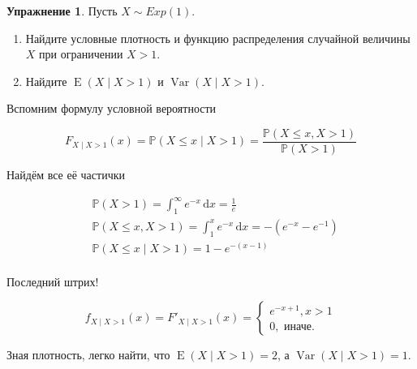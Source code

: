 \documentclass[12pt, a4paper, oneside]{extreport}
\DeclareMathOperator{\Var}{Var}
\DeclareMathOperator{\E}{\mathop{E}}
\def \mbb{\mathbb}
\def \PP{\mbb{P}}
\newcommand{\dx}[1]{\,\mathrm{d}#1} %
\theoremstyle{plain}              %
\theoremstyle{definition}         %
\newtheorem{problem}{\color{myblue} Упражнение}
\begin{document}
\begin{problem} 
Пусть $X \sim Exp(1)$. 

\begin{enumerate} 
\item  Найдите условные плотность и функцию распределения случайной величины $X$ при ограничении $X > 1$.
\item  Найдите $\E(X \mid X > 1)$ и  $\Var(X \mid X > 1)$.
\end{enumerate} 
\begin{sol}
	Вспомним формулу условной вероятности
	
	\[ F_{X \mid X > 1} (x) = \PP(X \le x \mid X > 1) = \frac{\PP(X \le x, X > 1)}{\PP(X > 1)}\]
	
Найдём все её частички

\begin{equation*}
\begin{aligned}
& \PP(X > 1) = \int_1^{\infty} e^{-x} \dx{x} = \frac{1}{e} \\ 
& \PP(X \le x, X >1) = \int_1^x e^{-x} \dx{x} = -(e^{-x} - e^{-1}) \\
& \PP(X \le x \mid X > 1) = 1 - e^{-(x - 1)} \\
\end{aligned}
\end{equation*}

Последний штрих! 

\[ f_{X \mid X > 1} (x) =  F'_{X \mid X > 1} (x) = \begin{cases} e^{-x + 1}, x > 1 \\ 0, \text{  иначе.} \end{cases} \]

Зная плотность, легко найти, что $\E(X \mid X >1) = 2$, а $\Var(X \mid X > 1) = 1$. 
	
\end{sol} 
\end{problem}
\end{document}
